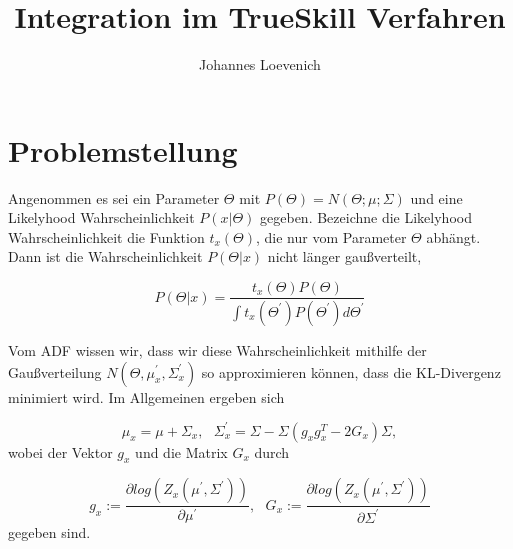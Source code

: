 \documentclass[12pt,a4paper]{scrartcl}
\title{Integration im TrueSkill Verfahren}
\author{Johannes Loevenich}
\numberwithin{equation}{section}
\begin{document}
\maketitle

\begin{abstract}

\end{abstract}

\section{Problemstellung}
Angenommen es sei ein Parameter $\varTheta$ mit $P(\varTheta) = N(\varTheta; \mu;\varSigma)$ und eine Likelyhood Wahrscheinlichkeit $P(x|\varTheta)$ gegeben. 
Bezeichne die Likelyhood Wahrscheinlichkeit die Funktion $t_x(\varTheta)$, die nur vom Parameter $\varTheta$ abhängt. 
Dann ist die Wahrscheinlichkeit $P(\varTheta|x)$ nicht länger gaußverteilt, 

\begin{equation}
  P(\varTheta|x) = \frac{t_x(\varTheta)P(\varTheta)}{\int t_x(\varTheta^{'})P(\varTheta^{'})d\varTheta^{'}}
\end{equation}

Vom ADF wissen wir, dass wir diese Wahrscheinlichkeit mithilfe der Gaußverteilung $N(\varTheta,\mu_x^{'},\varSigma_x^{'})$ so approximieren können, dass die KL-Divergenz minimiert wird. 
Im Allgemeinen ergeben sich 

\begin{equation}
 \mu_x = \mu + \varSigma_x, \text{			} \varSigma_x^{'} = \varSigma - \varSigma(g_xg_x^T - 2G_x)\varSigma,
\end{equation}
 wobei der Vektor \textbf{$g_x$} und die Matrix $G_x$ durch  

 \begin{equation}
  g_x := \frac{\partial log(Z_x(\mu^{'},\varSigma^{'}))}{\partial \mu^{'}}, \text{			} G_x := \frac{\partial log(Z_x(\mu^{'},\varSigma^{'}))}{\partial \varSigma^{'}}
 \end{equation}
gegeben sind. 
 
\end{document}
